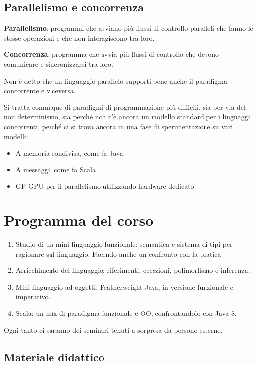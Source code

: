 \subsection{Parallelismo e concorrenza}

\textbf{Parallelismo}: programmi che avviano più flussi di controllo paralleli che fanno le stesse operazioni e che non interagiscono tra loro.

\textbf{Concorrenza}: programma che avvia più flussi di controllo che devono comunicare e sincronizzarsi tra loro.

Non è detto che un linguaggio parallelo supporti bene anche il paradigma concorrente e viceversa.

Si tratta comunque di paradigmi di programmazione più difficili, sia per via del non determinismo, sia perché non c'è ancora un modello standard per i linguaggi concorrenti, perché ci si trova ancora in una fase di sperimentazione su vari modelli:
\begin{itemize}
	\item A memoria condivisa, come fa Java
	\item A messaggi, come fa Scala
	\item GP-GPU per il parallelismo utilizzando hardware dedicato
\end{itemize}

\section{Programma del corso}

\begin{enumerate}
	\item Studio di un mini linguaggio funzionale: semantica e sistema di tipi per ragionare sul linguaggio. Facendo anche un confronto con la pratica
	\item Arricchimento del linguaggio: riferimenti, eccezioni, polimorfismo e inferenza.
	\item Mini linguaggio ad oggetti: Featherweight Java, in versione funzionale e imperativo.
	\item Scala: un mix di paradigma funzionale e OO, confrontandolo con Java 8.
\end{enumerate}

Ogni tanto ci saranno dei seminari tenuti a sorpresa da persone esterne.

\subsection{Materiale didattico}

